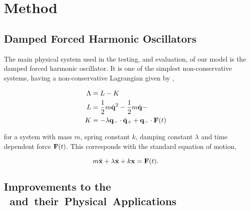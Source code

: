 \section{Method}
%

\subsection{Damped Forced Harmonic Oscillators}
\label{sec:eg-sys}

The main physical system used in the testing, and evaluation, of our model is the damped forced harmonic oscillator. It is one of the simplest non-conservative systems, having a non-conservative Lagrangian given by \cite{galleyPrincipleStationaryNonconservative2014},

\begin{equation}
\label{eq:dho-sys-embedding}
\begin{aligned}
  \Lambda &= L - K \\
  L &= \frac12 m\dot{\vb{q}}^2 - \frac12 m\dot{\vb{q}} -  \\
  K &= - \lambda\vb{q}_- \cdot \dot {\vb{q}}_+ + \vb{q}_- \cdot \vb{F}(t)
\end{aligned}
\end{equation}

\noindent for a system with mass $m$, spring constant $k$, damping constant $\lambda$ and time dependent force $\vb{F}(t)$. This corresponds with the standard equation of motion,

\begin{equation}
  m \ddot{\vb x} + \lambda \dot{\vb x} + k \vb x = \vb F(t).
\end{equation}

\subsection{Improvements to the \SI{} and their Physical Applications}

